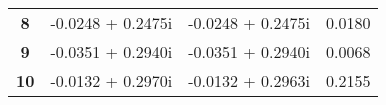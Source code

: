 \begin{table}[htp]
\begin{tabularx}{\textwidth}{c>{\centering}X>{\centering}Xc}
    \textbf{8 } & \num{-0.0248 + 0.2475i}                 & \num{-0.0248 + 0.2475i}                & \num{0.0180}                                                                                                                   \\
    \textbf{9 } & \num{-0.0351 + 0.2940i}                 & \num{-0.0351 + 0.2940i}                & \num{0.0068}                                                                                                                   \\
    \textbf{10} & \num{-0.0132 + 0.2970i}                 & \num{-0.0132 + 0.2963i}                & \num{0.2155}                                                                                                                   \\ \bottomrule
  \end{tabularx}
\end{table}

\begin{table}[htp]
  \renewcommand{\arraystretch}{1.5}
  \centering
  \caption{管路系统的主要特征参数}
  \label{table:Main-Feedline-Parameter}
\end{table}

